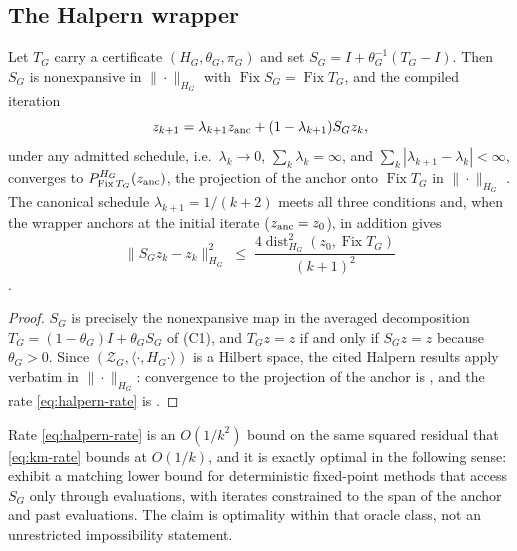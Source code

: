 \subsection{The Halpern wrapper}

\begin{proposition}
\label{prop:halpern}
Let $T_G$ carry a certificate $(H_G,\theta_G,\pi_G)$ and set
$S_G=I+\theta_G^{-1}(T_G-I)$. Then $S_G$ is nonexpansive in
$\|\cdot\|_{H_G}$ with $\operatorname{Fix}S_G=\operatorname{Fix}T_G$, and the
compiled iteration
\begin{equation}
 z_{k+1}=\lambda_{k+1}z_{\rm anc}+(1-\lambda_{k+1})S_Gz_k ,
 \label{eq:halpern}
\end{equation}
under any admitted schedule, i.e.\ $\lambda_k\to0$,
$\sum_k\lambda_k=\infty$, and $\sum_k|\lambda_{k+1}-\lambda_k|<\infty$,
converges to $P^{H_G}_{\operatorname{Fix}T_G}(z_{\rm anc})$, the projection
of the anchor onto $\operatorname{Fix}T_G$ in $\|\cdot\|_{H_G}$
\citep{Halpern1967Fixed,Wittmann1992Approximation}. The canonical schedule
$\lambda_{k+1}=1/(k+2)$ meets all three conditions and, when the wrapper
anchors at the initial iterate ($z_{\rm anc}=z_0$), in addition gives
\begin{equation}
 \|S_Gz_k-z_k\|_{H_G}^2
 \;\leq\;
 \frac{4\operatorname{dist}_{H_G}^2\!\left(z_0,\operatorname{Fix}
 T_G\right)}{(k+1)^2}
 \label{eq:halpern-rate}
\end{equation}
\citep{Lieder2021Optimized,Kim2021Accelerated}.
\end{proposition}

\begin{proof}
$S_G$ is precisely the nonexpansive map in the averaged decomposition
$T_G=(1-\theta_G)I+\theta_GS_G$ of (C1), and $T_Gz=z$ if and only if
$S_Gz=z$ because $\theta_G>0$. Since $(\mathcal Z_G,\langle\cdot,H_G
\cdot\rangle)$ is a Hilbert space, the cited Halpern results apply verbatim
in $\|\cdot\|_{H_G}$: convergence to the projection of the anchor is
\citet{Wittmann1992Approximation}, and the rate \eqref{eq:halpern-rate} is
\citet{Lieder2021Optimized}.
\end{proof}

Rate \eqref{eq:halpern-rate} is an $O(1/k^2)$ bound on the same squared
residual that \eqref{eq:km-rate} bounds at $O(1/k)$, and it is exactly
optimal in the following sense: \citet{ParkRyu2022Exact} exhibit a matching
lower bound for deterministic fixed-point methods that access $S_G$ only
through evaluations, with iterates constrained to the span of the anchor and
past evaluations. The claim is optimality within that oracle class, not an
unrestricted impossibility statement.

